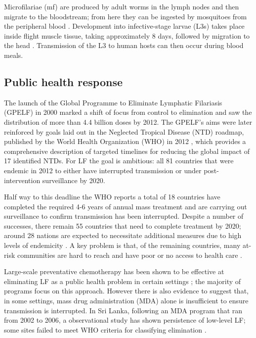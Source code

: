 \documentclass[5p,times]{elsarticle}
\begin{document}
Microfilariae (mf) are produced by adult worms in the lymph nodes and then migrate to the bloodstream; from here they can be ingested by mosquitoes from the peripheral blood \cite{taylor2010}. Development into infective-stage larvae (L3s) takes place inside flight muscle tissue, taking approximately 8 days, followed by migration to the head \cite{erickson2009}. Transmission of the L3 to human hosts can then occur during blood meals. 


\subsection{Public health response}
The launch of the Global Programme to Eliminate Lymphatic Filariasis (GPELF) in 2000 marked a shift of focus from control to elimination \cite{GPELF} and saw the distribution of more than 4.4 billion doses by 2012. The GPELF's aims were later reinforced by goals laid out in the Neglected Tropical Disease (NTD) roadmap, published by the World Health Organization (WHO) in 2012 \cite{Roadmap}, which provides a comprehensive description of targeted timelines for reducing the global impact of 17 identified NTDs. For LF the goal is ambitious: all 81 countries that were endemic in 2012 to either have interrupted transmission or under post-intervention surveillance by 2020.

Half way to this deadline the WHO reports a total of 18 countries have completed the required 4-6 years of annual mass treatment and are carrying out surveillance to confirm transmission has been interrupted. Despite a number of successes, there remain 55 countries that need to complete treatment by 2020; around 28 nations are expected to necessitate additional measures due to high levels of endemicity \cite{WHOfactsheet}. A key problem is that, of the remaining countries, many at-risk communities are hard to reach and have poor or no access to health care \cite{koudou2014}.

Large-scale preventative chemotherapy has been shown to be effective at eliminating LF as a public health problem in certain settings \cite{de2013,cheun2009}; the majority of programs focus on this approach. However there is also evidence to suggest that, in some settings, mass drug administration (MDA) alone is insufficient to ensure transmission is interrupted. In Sri Lanka, following an MDA program that ran from 2002 to 2006, a observational study has shown persistence of low-level LF; some sites failed to meet WHO criteria for classifying elimination \cite{rao2014}.
\end{document}
